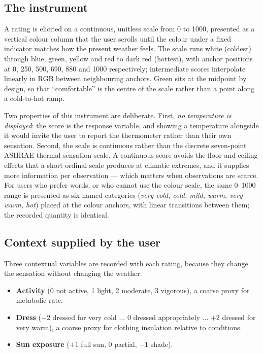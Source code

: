 \documentclass[11pt]{article}
\begin{document}
\subsection{The instrument}

A rating is elicited on a continuous, unitless scale from 0 to 1000, presented
as a vertical colour column that the user scrolls until the colour under a
fixed indicator matches how the present weather feels. The scale runs white
(coldest) through blue, green, yellow and red to dark red (hottest), with
anchor positions at 0, 250, 500, 690, 880 and 1000 respectively; intermediate
scores interpolate linearly in RGB between neighbouring anchors. Green sits at
the midpoint by design, so that ``comfortable'' is the centre of the scale
rather than a point along a cold-to-hot ramp.

Two properties of this instrument are deliberate. First, \emph{no temperature
is displayed}: the score is the response variable, and showing a temperature
alongside it would invite the user to report the thermometer rather than their
own sensation. Second, the scale is continuous rather than the discrete
seven-point ASHRAE thermal sensation scale. A continuous score avoids the
floor and ceiling effects that a short ordinal scale produces at climatic
extremes, and it supplies more information per observation --- which matters
when observations are scarce. For users who prefer words, or who cannot use
the colour scale, the same 0--1000 range is presented as six named categories
(\emph{very cold, cold, mild, warm, very warm, hot}) placed at the colour
anchors, with linear transitions between them; the recorded quantity is
identical.

\subsection{Context supplied by the user}

Three contextual variables are recorded with each rating, because they change
the sensation without changing the weather:

\begin{itemize}
\item \textbf{Activity} (0 not active, 1 light, 2 moderate, 3 vigorous), a
      coarse proxy for metabolic rate.
\item \textbf{Dress} ($-2$ dressed for very cold $\ldots$ $0$ dressed
      appropriately $\ldots$ $+2$ dressed for very warm), a coarse proxy for
      clothing insulation relative to conditions.
\item \textbf{Sun exposure} ($+1$ full sun, $0$ partial, $-1$ shade).
\end{itemize}
\end{document}
